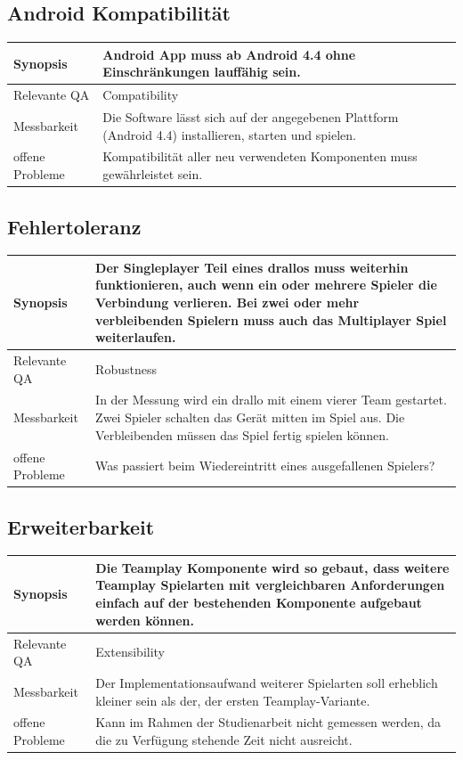 \subsection{Android Kompatibilität}
\begin{tabular}{|p{}|p{}|} \hline
	Synopsis & Android App muss ab Android 4.4 ohne Einschränkungen lauffähig sein. \\ \hline
	Relevante QA & Compatibility   \\ \hline
	Messbarkeit & Die Software lässt sich auf der angegebenen Plattform (Android 4.4) installieren, starten und spielen. \\ \hline
	offene Probleme & Kompatibilität aller neu verwendeten Komponenten muss gewährleistet sein.  \\ \hline
\end{tabular}


\subsection{Fehlertoleranz}
\begin{tabular}{|p{}|p{}|} \hline
	Synopsis & Der Singleplayer Teil eines drallos muss weiterhin funktionieren, auch wenn ein oder mehrere Spieler die Verbindung verlieren. Bei zwei oder mehr verbleibenden Spielern muss auch das Multiplayer Spiel weiterlaufen. \\ \hline
	Relevante QA & Robustness  \\ \hline
	Messbarkeit & In der Messung wird ein drallo mit einem vierer Team gestartet. Zwei Spieler schalten das Gerät mitten im Spiel aus. Die Verbleibenden müssen das Spiel fertig spielen können. \\ \hline
	offene Probleme & Was passiert beim Wiedereintritt eines ausgefallenen Spielers?  \\ \hline
\end{tabular}


\subsection{Erweiterbarkeit}
\begin{tabular}{|p{}|p{}|} \hline
	Synopsis & Die Teamplay Komponente wird so gebaut, dass weitere Teamplay Spielarten mit vergleichbaren Anforderungen einfach auf der bestehenden Komponente aufgebaut werden können.\\ \hline
	Relevante QA & Extensibility   \\ \hline
	
	Messbarkeit & Der Implementationsaufwand weiterer Spielarten soll erheblich kleiner sein als der, der ersten Teamplay-Variante. \\ \hline
	offene Probleme &  Kann im Rahmen der Studienarbeit nicht gemessen werden, da die zu Verfügung stehende Zeit nicht ausreicht. \\ \hline
\end{tabular}


